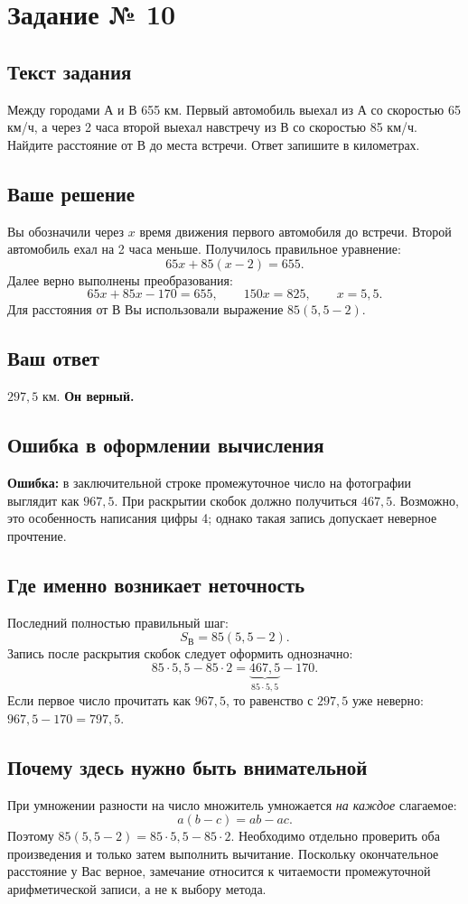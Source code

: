 \documentclass[a4paper,12pt]{article}
\begin{document}
\label{task:10}
\section*{Задание № 10}
\subsection*{Текст задания}
Между городами А и В 655 км. Первый автомобиль выехал из А со скоростью 65 км/ч, а через 2 часа второй выехал навстречу из В со скоростью 85 км/ч. Найдите расстояние от В до места встречи. Ответ запишите в километрах.

\subsection*{Ваше решение}
Вы обозначили через $x$ время движения первого автомобиля до встречи. Второй автомобиль ехал на 2 часа меньше. Получилось правильное уравнение:
\[
65x+85(x-2)=655.
\]
Далее верно выполнены преобразования:
\[
65x+85x-170=655,
\qquad 150x=825,
\qquad x=5{,}5.
\]
Для расстояния от В Вы использовали выражение $85(5{,}5-2)$.

\subsection*{Ваш ответ}
$297{,}5$ км. \textbf{Он верный.}

\subsection*{Ошибка в оформлении вычисления}
\textcolor{critical}{\textbf{Ошибка:}} в заключительной строке промежуточное число на фотографии выглядит как $967{,}5$. При раскрытии скобок должно получиться $467{,}5$. Возможно, это особенность написания цифры 4; однако такая запись допускает неверное прочтение.

\subsection*{Где именно возникает неточность}
Последний полностью правильный шаг:
\[
S_{\text{В}}=85(5{,}5-2).
\]
Запись после раскрытия скобок следует оформить однозначно:
\[
85\cdot5{,}5-85\cdot2
=\underbrace{467{,}5}_{85\cdot5{,}5}-170.
\]
Если первое число прочитать как $967{,}5$, то равенство с $297{,}5$ уже неверно: $967{,}5-170=797{,}5$.

\subsection*{Почему здесь нужно быть внимательной}
При умножении разности на число множитель умножается \emph{на каждое} слагаемое:
\[
a(b-c)=ab-ac.
\]
Поэтому $85(5{,}5-2)=85\cdot5{,}5-85\cdot2$. Необходимо отдельно проверить оба произведения и только затем выполнить вычитание. Поскольку окончательное расстояние у Вас верное, замечание относится к читаемости промежуточной арифметической записи, а не к выбору метода.
\end{document}
